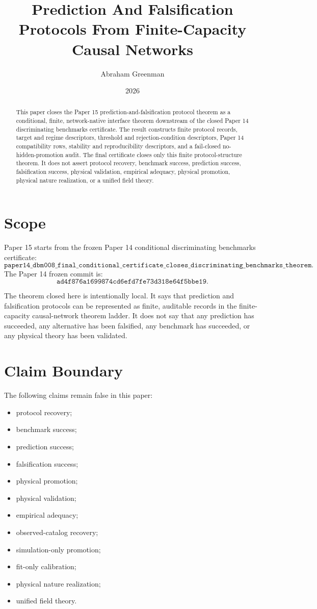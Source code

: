 \documentclass{article}
\title{Prediction And Falsification Protocols From Finite-Capacity Causal Networks}
\author{Abraham Greenman}
\date{2026}
\begin{document}
\maketitle

\begin{abstract}
This paper closes the Paper 15 prediction-and-falsification protocol theorem
as a conditional, finite, network-native interface theorem downstream of the
closed Paper 14 discriminating benchmarks certificate. The result constructs
finite protocol records, target and regime descriptors, threshold and
rejection-condition descriptors, Paper 14 compatibility rows, stability and
reproducibility descriptors, and a fail-closed no-hidden-promotion audit. The
final certificate closes only this finite protocol-structure theorem. It does
not assert protocol recovery, benchmark success, prediction success,
falsification success, physical validation, empirical adequacy, physical
promotion, physical nature realization, or a unified field theory.
\end{abstract}

\section{Scope}

Paper 15 starts from the frozen Paper 14 conditional discriminating benchmarks
certificate:
\[
\texttt{paper14\_dbm008\_final\_conditional\_certificate\_closes\_discriminating\_benchmarks\_theorem}.
\]
The Paper 14 frozen commit is:
\[
\texttt{ad4f876a1699874cd6efd7fe73d318e64f5bbe19}.
\]

The theorem closed here is intentionally local. It says that prediction and
falsification protocols can be represented as finite, auditable records in the
finite-capacity causal-network theorem ladder. It does not say that any
prediction has succeeded, any alternative has been falsified, any benchmark
has succeeded, or any physical theory has been validated.

\section{Claim Boundary}

The following claims remain false in this paper:

\begin{itemize}[leftmargin=*]
\item protocol recovery;
\item benchmark success;
\item prediction success;
\item falsification success;
\item physical promotion;
\item physical validation;
\item empirical adequacy;
\item observed-catalog recovery;
\item simulation-only promotion;
\item fit-only calibration;
\item physical nature realization;
\item unified field theory.
\end{itemize}
\end{document}
